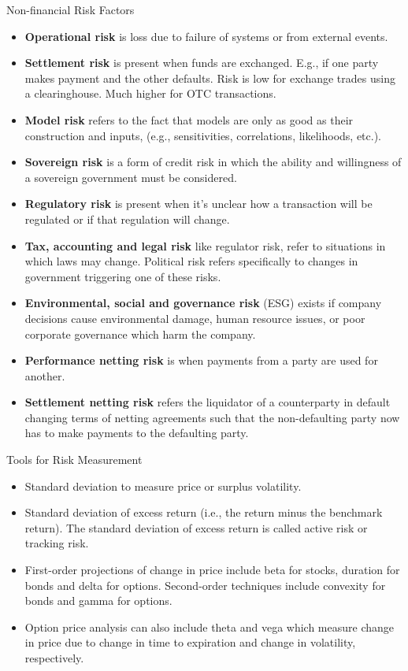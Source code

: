 \documentclass[../custom]{flashcards}
\newcommand{\studyArea}{Risk Management}
\begin{document}
\begin{flashcard}[\studyArea]{Non-financial Risk Factors}
    \vspace{-3mm}
    \begin{itemize}[itemsep=.2\itemsep]
        \item \textbf{Operational risk} is loss due to failure of systems or from external events.
        \item \textbf{Settlement risk} is present when funds are exchanged. E.g., if one party makes payment and the other defaults. Risk is low for exchange trades using a clearinghouse. Much higher for OTC transactions.
        \item \textbf{Model risk} refers to the fact that models are only as good as their construction and inputs, (e.g., sensitivities, correlations, likelihoods, etc.).
        \item \textbf{Sovereign risk} is a form of credit risk in which the ability and willingness of a sovereign government must be considered.
        \item \textbf{Regulatory risk} is present when it's unclear how a transaction will be regulated or if that regulation will change.
        \item \textbf{Tax, accounting and legal risk} like regulator risk, refer to situations in which laws may change. Political risk refers specifically to changes in government triggering one of these risks.
        \item \textbf{Environmental, social and governance risk} (ESG) exists if company decisions cause environmental damage, human resource issues, or poor corporate governance which harm the company.
        \item \textbf{Performance netting risk} is when payments from a party are used for another.
        \item \textbf{Settlement netting risk} refers the liquidator of a counterparty in default changing terms of netting agreements such that the non-defaulting party now has to make payments to the defaulting party.
    \end{itemize}
\end{flashcard}

\begin{flashcard}[\studyArea]{Tools for Risk Measurement}
    \begin{itemize}
        \item Standard deviation to measure price or surplus volatility.
        \item Standard deviation of excess return (i.e., the return minus the benchmark return). The standard deviation of excess return is called active risk or tracking risk.
        \item First-order projections of change in price include beta for stocks, duration for bonds and delta for options. Second-order techniques include convexity for bonds and gamma for options.
        \item Option price analysis can also include theta and vega which measure change in price due to change in time to expiration and change in volatility, respectively.
    \end{itemize}
\end{flashcard}
\end{document}
